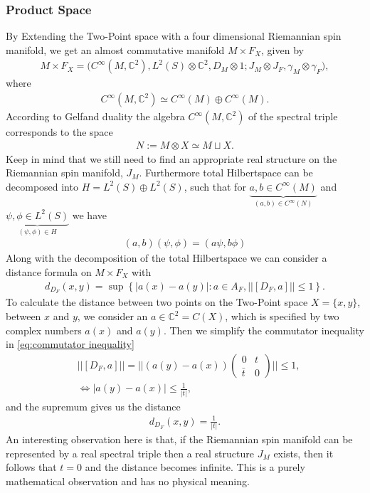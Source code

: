 \subsubsection{Product Space}
By Extending the Two-Point space with a four dimensional Riemannian spin
manifold, we get an almost commutative manifold $M\times F_X$, given by
\begin{align}
    M\times F_X = \big(C^\infty(M, \mathbb{C}^2), L^2(S)\otimes \mathbb{C}^2,
    D_M\otimes 1 ; J_M\otimes J_F, \gamma_M \otimes \gamma_F\big),
\end{align}
where
\begin{align}
   C^\infty(M, \mathbb{C}^2) \simeq C^\infty(M) \oplus  C^\infty(M).
\end{align}
According to Gelfand duality the algebra $C^\infty(M, \mathbb{C}^2)$ of the
spectral triple corresponds to the space
\begin{align}
    N:= M\otimes X \simeq M\sqcup X.
\end{align}
Keep in mind that we still need to find an appropriate real structure on the
Riemannian spin manifold, $J_M$. Furthermore total Hilbertspace can be decomposed into $H = L^2(S) \oplus L^2(S)$, such that for
$\underbrace{a,b\in C^\infty(M)}_{(a, b) \in C^\infty(N)}$
and $\underbrace{\psi, \phi \in L^2(S)}_{(\psi, \phi) \in H}$ we have
\begin{align}
    (a, b)(\psi, \phi) = (a\psi, b\phi)
\end{align}
Along with the decomposition of the total Hilbertspace we can consider a
distance formula on $M\times F_X$ with
\begin{align}\label{eq:commutator inequality}
    d_{D_F}(x,y) = \sup\left\{  |a(x) - a(y)|:a\in A_F, ||[D_F, a]|| \leq
    1 \right\}.
\end{align}
To calculate the distance between two points on the Two-Point space $X= \{x,
y\}$, between $x$ and $y$, we consider an $a \in \mathbb{C}^2 = C(X)$, which is
specified by two complex numbers $a(x)$ and $a(y)$. Then we simplify the
commutator inequality in \eqref{eq:commutator inequality}
\begin{align}
    &||[D_F , a]|| = ||(a(y) - a(x))\begin{pmatrix}0 &t\\\bar{t} &0
    \end{pmatrix}|| \leq 1,\\
    &\Leftrightarrow |a(y) - a(x)|\leq \frac{1}{|t|},
\end{align}
and the supremum gives us the distance
\begin{align}
    d_{D_F} (x,y) = \frac{1}{|t|}.
\end{align}
An interesting observation here is that, if the Riemannian spin manifold can be
represented by a real spectral triple then a real structure $J_M$ exists,
then it follows that $t=0$ and the distance becomes infinite. This is a
purely mathematical observation and has no physical meaning.


